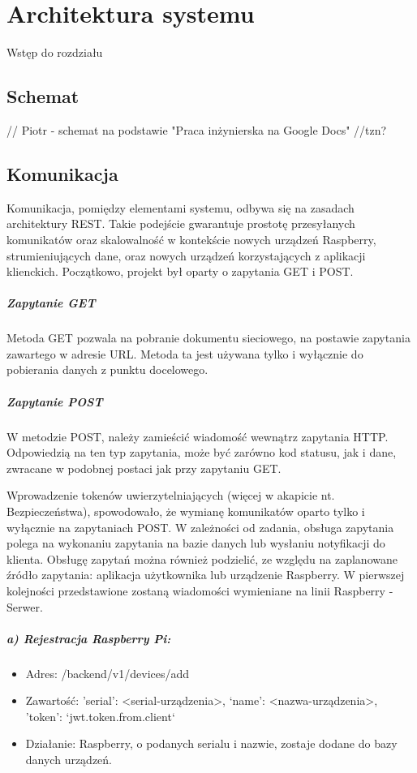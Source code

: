 \chapter{Architektura systemu}

Wstęp do rozdziału

\section*{Schemat}

// Piotr - schemat na podstawie "Praca inżynierska na Google Docs"
//tzn?

\section*{Komunikacja}

Komunikacja, pomiędzy elementami systemu, odbywa się na zasadach architektury REST. Takie podejście gwarantuje prostotę przesyłanych komunikatów oraz skalowalność w kontekście nowych urządzeń Raspberry, strumieniujących dane, oraz nowych urządzeń korzystających z aplikacji klienckich. Początkowo, projekt był oparty o zapytania GET i POST.  

\paragraph{Zapytanie GET}
Metoda GET pozwala na pobranie dokumentu sieciowego, na postawie zapytania zawartego w adresie URL. Metoda ta jest używana tylko i wyłącznie do pobierania danych z punktu docelowego. 

\paragraph{Zapytanie POST}
W metodzie POST, należy zamieścić wiadomość wewnątrz zapytania HTTP. Odpowiedzią na ten typ zapytania, może być zarówno kod statusu, jak i dane, zwracane w podobnej postaci jak przy zapytaniu GET.


Wprowadzenie tokenów uwierzytelniających (więcej w akapicie nt. Bezpieczeństwa), spowodowało, że wymianę komunikatów oparto tylko i wyłącznie na zapytaniach POST. 
W zależności od zadania, obsługa zapytania polega na wykonaniu zapytania na bazie danych lub wysłaniu notyfikacji do klienta.
Obsługę zapytań można również podzielić, ze względu na zaplanowane źródło zapytania: aplikacja użytkownika lub urządzenie Raspberry.
W pierwszej kolejności przedstawione zostaną wiadomości wymieniane na linii Raspberry - Serwer.
\paragraph{a) Rejestracja Raspberry Pi:}
\begin{itemize}
\item Adres: /backend/v1/devices/add
\item Zawartość: {'serial': <serial-urządzenia>, ‘name’: <nazwa-urządzenia>, 'token': `jwt.token.from.client`}
\item Działanie: Raspberry, o podanych serialu i nazwie, zostaje dodane do bazy danych urządzeń.
\end{itemize}
